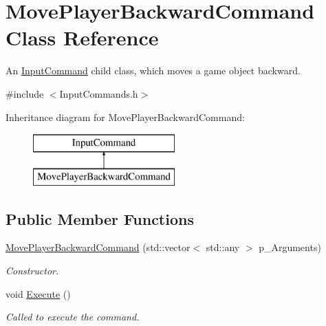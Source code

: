 \hypertarget{class_move_player_backward_command}{}\section{Move\+Player\+Backward\+Command Class Reference}
\label{class_move_player_backward_command}


An \mbox{\hyperlink{class_input_command}{Input\+Command}} child class, which moves a game object backward.  




{\ttfamily \#include $<$Input\+Commands.\+h$>$}

Inheritance diagram for Move\+Player\+Backward\+Command\+:\begin{figure}[H]
\begin{center}
\leavevmode
\includegraphics[height=2.000000cm]{class_move_player_backward_command}
\end{center}
\end{figure}
\subsection*{Public Member Functions}
\begin{DoxyCompactItemize}
\item 
\mbox{\hyperlink{class_move_player_backward_command_a224ce8339fde165126b204039487863b}{Move\+Player\+Backward\+Command}} (std\+::vector$<$ std\+::any $>$ p\+\_\+\+Arguments)
\begin{DoxyCompactList}\small\item\em Constructor. \end{DoxyCompactList}\item 
\mbox{\label{class_move_player_backward_command_a0436751a3f2e585bd704fd28e38c8bfc}} 
void \mbox{\hyperlink{class_move_player_backward_command_a0436751a3f2e585bd704fd28e38c8bfc}{Execute}} ()
\begin{DoxyCompactList}\small\item\em Called to execute the command. \end{DoxyCompactList}\end{DoxyCompactItemize}

